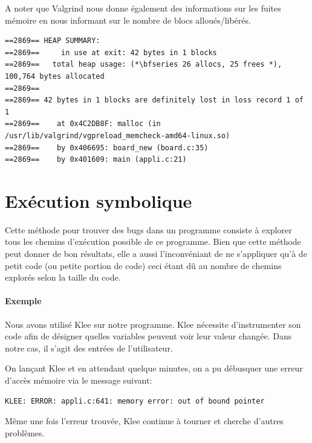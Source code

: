 \documentclass{report}
\begin{document}
A noter que Valgrind nous donne également des informations sur les fuites mémoire en nous informant sur le nombre de blocs alloués/libérés.

\begin{scriptsize}
  \begin{lstlisting}
==2869== HEAP SUMMARY:
==2869==     in use at exit: 42 bytes in 1 blocks
==2869==   total heap usage: (*\bfseries 26 allocs, 25 frees *), 100,764 bytes allocated
==2869== 
==2869== 42 bytes in 1 blocks are definitely lost in loss record 1 of 1
==2869==    at 0x4C2DB8F: malloc (in /usr/lib/valgrind/vgpreload_memcheck-amd64-linux.so)
==2869==    by 0x406695: board_new (board.c:35)
==2869==    by 0x401609: main (appli.c:21)
  \end{lstlisting}
\end{scriptsize}

\section{Exécution symbolique}
Cette méthode pour trouver des bugs dans un programme consiste à explorer tous les chemins d'exécution possible de ce programme. Bien que cette méthode peut donner de bon résultats, elle a aussi l'inconvéniant de ne s'appliquer qu'à de petit code (ou petite portion de code) ceci étant dû au nombre de chemins explorés selon la taille du code. 

\paragraph{Exemple}
Nous avons utilisé Klee sur notre programme. Klee nécessite d'instrumenter son code afin de désigner quelles variables peuvent voir leur valeur changée. Dans notre cas, il s'agit des entrées de l'utilisateur.

On lançant Klee et en attendant quelque minutes, on a pu débusquer une erreur d'accès mémoire via le message suivant:
\begin{scriptsize}
  \begin{lstlisting}
KLEE: ERROR: appli.c:641: memory error: out of bound pointer
  \end{lstlisting}
\end{scriptsize}

Même une fois l'erreur trouvée, Klee continue à tourner et cherche d'autres problèmes.
\end{document}
